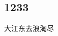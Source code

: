 \documentclass{article}
\begin{document}
\begin{CJK*}{GBK}{song}
\section{\textbf{1233}}
大江东去浪淘尽
\end{CJK*}
\end{document}
